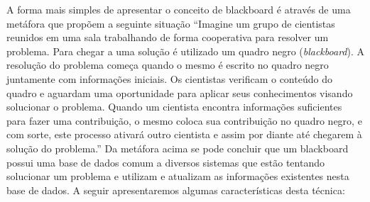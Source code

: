 	A forma mais simples de apresentar o conceito de blackboard é através de uma metáfora que propõem a seguinte situação  “Imagine um grupo de cientistas reunidos em uma sala trabalhando de forma cooperativa para resolver um problema. Para chegar a uma solução é utilizado um quadro negro (\textit{blackboard}).
A resolução do problema começa quando o mesmo é escrito no quadro negro juntamente com informações iniciais. Os cientistas verificam o conteúdo do quadro e aguardam uma oportunidade para aplicar seus conhecimentos visando solucionar o problema. Quando um cientista encontra informações suficientes para fazer uma contribuição, o mesmo coloca sua contribuição no quadro negro, e com sorte, este processo ativará outro cientista e assim por diante até chegarem à solução do problema.”
	Da metáfora acima se pode concluir que um blackboard possui uma base de dados comum a diversos sistemas que estão tentando solucionar um problema e utilizam e atualizam as informações existentes nesta base de dados.
	 A seguir apresentaremos algumas características desta técnica:
